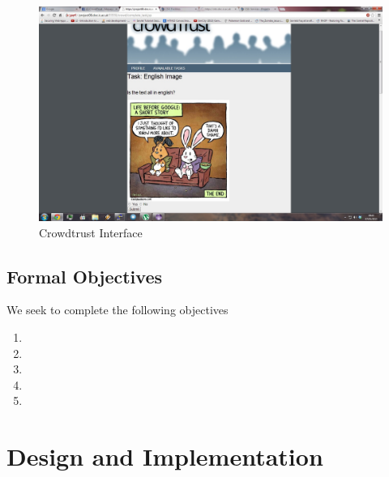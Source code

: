 \documentclass[11pt]{article}
\begin{document}
\begin{figure}[H]
\begin{center}
\includegraphics[width=\linewidth]{images/crowdtrustinterface.jpg}
\caption{Crowdtrust Interface}
\label{default}
\end{center}
\end{figure}

\subsection{Formal Objectives}
We seek to complete the following objectives
\begin{enumerate}
\item
\item
\item

\item

\item

\end{enumerate}



\section{Design and Implementation}
\end{document}
